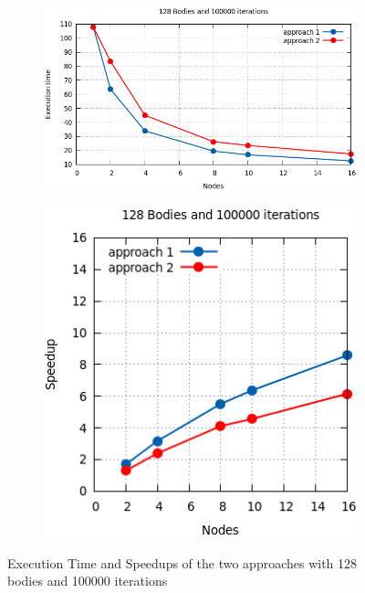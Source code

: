 \documentclass[a4paper]{article}
\begin{document}
\begin{figure}[ht]
\begin{subfigure}{.55\textwidth}
  \centering
  \includegraphics[width=1\linewidth]{results/graph1}
\end{subfigure} %
\begin{subfigure}{.35\textwidth}
  \centering
  \includegraphics[width=1\linewidth]{results/graph1_sp}
\end{subfigure} 
  \caption{Execution Time and Speedups of the two approaches with 128 bodies and 100000 iterations}
  \label{fig:G1}
\end{figure}
\FloatBarrier
\end{document}
